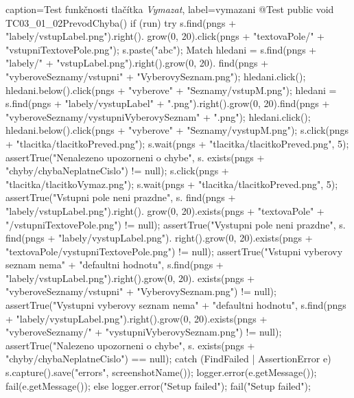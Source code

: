 \begin{lstjava}{caption={Test funkčnosti tlačítka \emph{Vymazat}}, label={vymazani}}
@Test
public void TC03_01_02PrevodChyba() {
  if (run) {
    try {
      s.find(pngs + "labely/vstupLabel.png").right().
        grow(0, 20).click(pngs + "textovaPole/" +
        "vstupniTextovePole.png");
      s.paste("abc");
      Match hledani = s.find(pngs + "labely/" +
        "vstupLabel.png").right().grow(0, 20).
        find(pngs + "vyberoveSeznamy/vstupni" +
        "VyberovySeznam.png");
      hledani.click();
      hledani.below().click(pngs + "vyberove" +
        "Seznamy/vstupM.png");
      hledani = s.find(pngs + "labely/vystupLabel" +
        ".png").right().grow(0, 20).find(pngs +
        "vyberoveSeznamy/vystupniVyberovySeznam" +
        ".png");
      hledani.click();
      hledani.below().click(pngs + "vyberove" +
        "Seznamy/vystupM.png");
      s.click(pngs + "tlacitka/tlacitkoPreved.png");
      s.wait(pngs + "tlacitka/tlacitkoPreved.png",
        5);
      assertTrue("Nenalezeno upozorneni o chybe", s.
        exists(pngs + "chyby/chybaNeplatneCislo") !=
        null);
      s.click(pngs + "tlacitka/tlacitkoVymaz.png");
      s.wait(pngs + "tlacitka/tlacitkoPreved.png",
        5);
      assertTrue("Vstupni pole neni prazdne", s.
        find(pngs + "labely/vstupLabel.png").right().
        grow(0, 20).exists(pngs + "textovaPole" +
        "/vstupniTextovePole.png") != null);
      assertTrue("Vystupni pole neni prazdne", s.
        find(pngs + "labely/vystupLabel.png").
        right().grow(0, 20).exists(pngs +
        "textovaPole/vystupniTextovePole.png") !=
        null);
      assertTrue("Vstupni vyberovy seznam nema" +
        "defaultni hodnotu", s.find(pngs +
        "labely/vstupLabel.png").right().grow(0, 20).
        exists(pngs + "vyberoveSeznamy/vstupni" +
        "VyberovySeznam.png") != null);
      assertTrue("Vystupni vyberovy seznam nema" +
        "defaultni hodnotu", s.find(pngs +
        "labely/vystupLabel.png").right().grow(0,
        20).exists(pngs + "vyberoveSeznamy/" +
        "vystupniVyberovySeznam.png") != null);
      assertTrue("Nalezeno upozorneni o chybe", s.
        exists(pngs + "chyby/chybaNeplatneCislo") ==
        null);
    } catch (FindFailed | AssertionError e) {
      s.capture().save("errors", screenshotName());
      logger.error(e.getMessage());
      fail(e.getMessage());
    }
  } else {
    logger.error("Setup failed");
    fail("Setup failed");
  }
}
\end{lstjava}